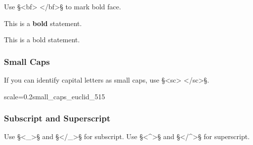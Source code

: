 \begin{mainruleLessImportant}
Use §<bf> </bf>§ to mark bold face.
\end{mainruleLessImportant}

\begin{example} 

\vspace{-4mm}
This is a \textbf{bold}  statement.

\begin{typeLatin}
This is a bold statement.
\end{typeLatin}
\end{example}

\subsubsection{Small Caps}
\label{section small caps}

\begin{mainrule}
If you can identify capital letters as small caps, use §<sc> </sc>§. 
\end{mainrule}


\vspace{3mm}
\begin{sampleImageSmall}{scale=0.2}{small_caps_euclid_515}


\end{sampleImageSmall}


\subsubsection{Subscript and Superscript}
\label{section subscript and superscript}

\begin{mainrule}
Use §<_>§ and §</_>§ for subscript. Use §<^>§ and §</^>§ for superscript.
\end{mainrule}

